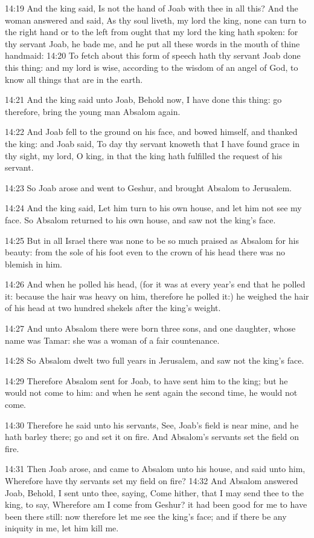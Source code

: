 14:19 And the king said, Is not the hand of Joab with thee in all this?  And the woman answered and said, As thy soul liveth, my lord the king, none can turn to the right hand or to the left from ought that my lord the king hath spoken: for thy servant Joab, he bade me, and he put all these words in the mouth of thine handmaid: 14:20 To fetch about this form of speech hath thy servant Joab done this thing: and my lord is wise, according to the wisdom of an angel of God, to know all things that are in the earth.

14:21 And the king said unto Joab, Behold now, I have done this thing: go therefore, bring the young man Absalom again.

14:22 And Joab fell to the ground on his face, and bowed himself, and thanked the king: and Joab said, To day thy servant knoweth that I have found grace in thy sight, my lord, O king, in that the king hath fulfilled the request of his servant.

14:23 So Joab arose and went to Geshur, and brought Absalom to Jerusalem.

14:24 And the king said, Let him turn to his own house, and let him not see my face. So Absalom returned to his own house, and saw not the king's face.

14:25 But in all Israel there was none to be so much praised as Absalom for his beauty: from the sole of his foot even to the crown of his head there was no blemish in him.

14:26 And when he polled his head, (for it was at every year's end that he polled it: because the hair was heavy on him, therefore he polled it:) he weighed the hair of his head at two hundred shekels after the king's weight.

14:27 And unto Absalom there were born three sons, and one daughter, whose name was Tamar: she was a woman of a fair countenance.

14:28 So Absalom dwelt two full years in Jerusalem, and saw not the king's face.

14:29 Therefore Absalom sent for Joab, to have sent him to the king; but he would not come to him: and when he sent again the second time, he would not come.

14:30 Therefore he said unto his servants, See, Joab's field is near mine, and he hath barley there; go and set it on fire. And Absalom's servants set the field on fire.

14:31 Then Joab arose, and came to Absalom unto his house, and said unto him, Wherefore have thy servants set my field on fire?  14:32 And Absalom answered Joab, Behold, I sent unto thee, saying, Come hither, that I may send thee to the king, to say, Wherefore am I come from Geshur? it had been good for me to have been there still: now therefore let me see the king's face; and if there be any iniquity in me, let him kill me.

